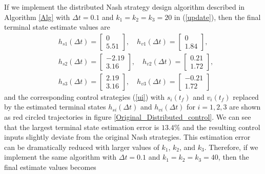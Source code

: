 \documentclass[12pt,draftcls,onecolumn]{IEEEtran}  %
\begin{document}
If we implement the distributed Nash strategy design algorithm described in Algorithm \ref{Alg} with $\Delta t=0.1$ and $k_1=k_2=k_3=20$ in (\ref{update}), then the final terminal state estimate values are
\begin{align*}
&h_{s1}(\Delta t)=\begin{bmatrix}
 0\\
    5.51
\end{bmatrix},\quad h_{v1}(\Delta t)=\begin{bmatrix}
  0\\
    1.84
\end{bmatrix},\\
&h_{s2}(\Delta t)=\begin{bmatrix}
 -2.19\\    3.16
\end{bmatrix},\quad h_{v2}(\Delta t)=\begin{bmatrix}
 0.21\\1.72
\end{bmatrix},\\
&h_{s3}(\Delta t)=\begin{bmatrix}
 2.19\\3.16
\end{bmatrix},\quad h_{v3}(\Delta t)=\begin{bmatrix}
-0.21\\    1.72
\end{bmatrix}
\end{align*}
and the corresponding control strategies (\ref{ui}) with $s_i(t_f)$ and $v_i(t_f)$ replaced by the estimated terminal states $h_{si}(\Delta t)$ and $h_{vi}(\Delta t)$ for $i=1,2,3$ are shown as red circled trajectories in figure \ref{Original_Distributed_control}. We can see that the largest terminal state estimation error is $13.4\%$ and the resulting control inputs slightly deviate from the original Nash strategies. This estimation error can be dramatically reduced with larger values of $k_1$, $k_2$, and $k_3$. Therefore, if we implement the same algorithm with $\Delta t=0.1$ and $k_1=k_2=k_3=40$, then the final estimate values becomes
\end{document}

